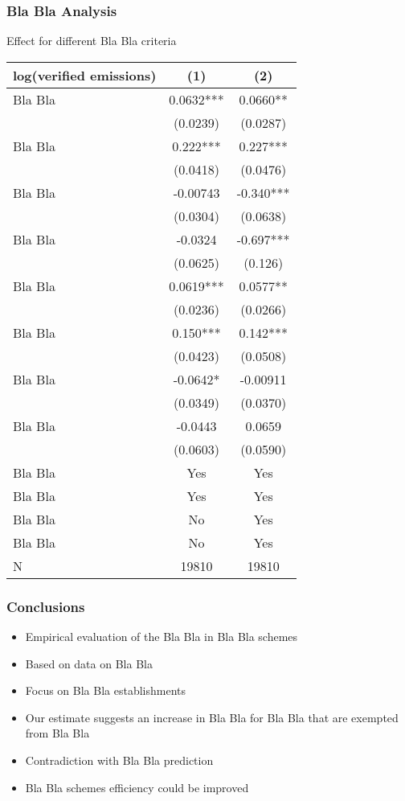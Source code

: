 \documentclass{beamer}
\begin{document}
\begin{frame}
\frametitle{Bla Bla Analysis}
Effect for different Bla Bla criteria
\begin{table}
\centering
\tiny
\label{tab:diff_in_diff_criteria}
\begin{tabular}{lcc}
\toprule
log(verified emissions) & (1) & (2)\\
\midrule
Bla Bla & 0.0632*** & 0.0660** \\
 & (0.0239) & (0.0287)   \\
Bla Bla & 0.222*** & 0.227***\\
 & (0.0418) & (0.0476)   \\
Bla Bla & -0.00743 & -0.340***\\
 & (0.0304) & (0.0638)   \\
Bla Bla & -0.0324 & -0.697***\\
 & (0.0625) & (0.126)   \\
Bla Bla & 0.0619*** & 0.0577** \\
 & (0.0236) & (0.0266)   \\
Bla Bla & 0.150*** & 0.142***\\
 & (0.0423) & (0.0508)   \\
Bla Bla & -0.0642* & -0.00911   \\
 & (0.0349) & (0.0370)   \\
Bla Bla & -0.0443 & 0.0659   \\
 & (0.0603) & (0.0590)   \\
\midrule
Bla Bla & Yes & Yes\\
Bla Bla & Yes & Yes\\
Bla Bla & No & Yes\\
Bla Bla & No & Yes\\
\midrule
N & 19810 & 19810\\
\bottomrule
\end{tabular}
\end{table}
\end{frame}

\begin{frame}
\frametitle{Conclusions}
\begin{itemize}
\item Empirical evaluation of the Bla Bla in Bla Bla schemes \pause
\item Based on data on Bla Bla \pause
\item Focus on Bla Bla establishments \pause
\item Our estimate suggests an increase in Bla Bla for Bla Bla that are exempted from Bla Bla \pause
\item Contradiction with Bla Bla prediction \pause
\item Bla Bla schemes efficiency could be improved
\end{itemize}
\end{frame}
\end{document}
